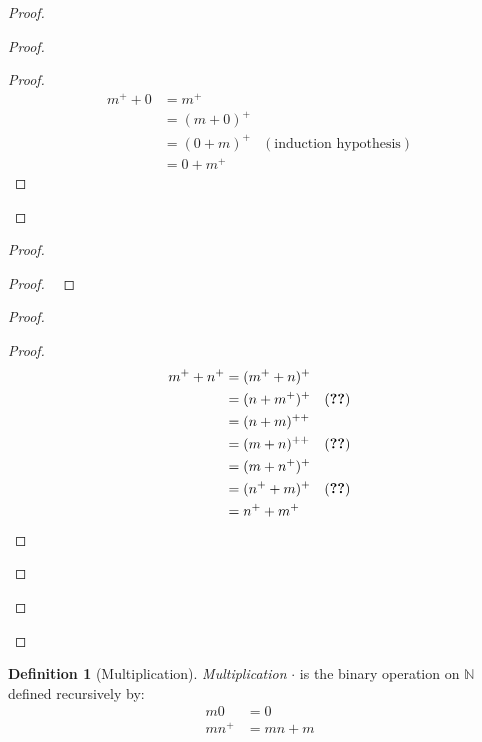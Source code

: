 \documentclass{book}
\let\qed\relax
\theoremstyle{definition}
\newtheorem{df}[ax]{Definition}
\begin{document}
\begin{proof}
\pf
{}
\begin{proof}
	\begin{proof}
		\pf
		\begin{align*}
			m^+ + 0 & = m^+ \\
			& = (m + 0)^+ \\
			& = (0 + m)^+ & (\text{induction hypothesis}) \\
			& = 0 + m^+
		\end{align*}
	\end{proof}
\end{proof}
\begin{proof}
	\begin{proof}
		\pf\ 
	\end{proof}
	\begin{proof}
		\begin{proof}
		\pf
		\begin{align*}
			m^+ + n^+ & = (m^+ + n)^+ \\
			& = (n + m^+)^+ & (\text{\stepref{ii}}) \\
			& = (n + m)^{++} \\
			& = (m + n)^{++} & (\text{\stepref{b}}) \\
			& = (m + n^+)^+ \\
			& = (n^+ + m)^+ & (\text{\stepref{b}}) \\
			& = n^+ + m^+
		\end{align*}
		\end{proof}
	\end{proof}
\end{proof}
\qed
\end{proof}

\begin{df}[Multiplication]
\emph{Multiplication} $\cdot$ is the binary operation on $\mathbb{N}$ defined recursively by:
\begin{align*}
m0 & = 0 \\
mn^+ & = mn + m
\end{align*}
\end{df}
\end{document}
